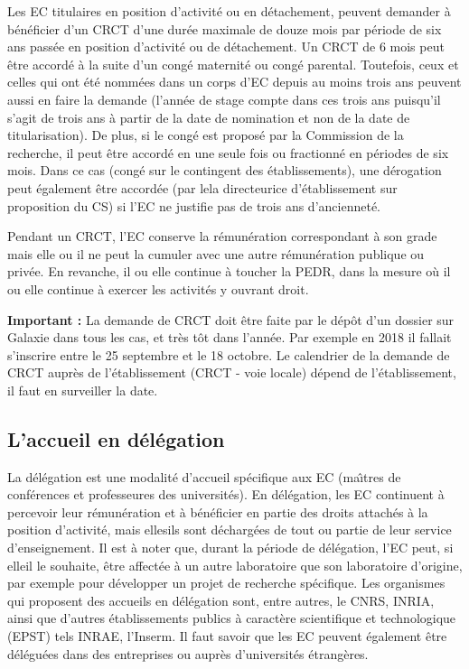 Les EC titulaires en position d'activit\'e ou en d\'etachement,
peuvent demander \`a b\'en\'eficier d'un CRCT d'une dur\'ee maximale
de douze mois par p\'eriode de six ans pass\'ee en position
d'activit\'e ou de d\'etachement. Un CRCT de 6 mois peut \^etre accord\'e
\`a la suite d'un cong\'e maternit\'e ou cong\'e parental.
Toutefois, ceux et celles qui ont \'et\'e
nomm\'e\mp e\mp s dans un corps d'EC depuis au moins trois ans peuvent aussi
en faire la demande (l'ann\'ee de stage compte dans ces trois ans
puisqu'il s'agit de trois ans \`a partir de la date de nomination et
non de la date de titularisation). De plus, si le cong\'e est
propos\'e par la Commission de la recherche, il peut \^etre accord\'e en
une seule fois ou fractionn\'e en p\'eriodes de six mois.
 Dans ce cas (cong\'e sur le contingent des
\'etablissements), une d\'erogation peut \'egalement \^etre accord\'ee
(par le\mp la directeur\mp ice d'\'etablissement sur proposition
du CS) si l'EC ne justifie pas de trois ans d'anciennet\'e.

Pendant un CRCT, l'EC conserve la r\'emun\'eration correspondant \`a son grade
mais elle ou il ne peut la cumuler avec une autre r\'emun\'eration publique ou priv\'ee.
En revanche, il ou elle continue \`a toucher la PEDR, dans la mesure o\`u il ou elle continue \`a exercer les activit\'es y ouvrant droit. 


\textbf{Important :} La demande de CRCT doit \^etre faite par le d\'ep\^ot d’un dossier sur Galaxie dans tous les cas, et tr\`es t\^ot dans l'ann\'ee. Par exemple en 2018 il fallait s'inscrire entre le 25 septembre et le 18 octobre. Le calendrier de la demande de CRCT aupr\`es de l’\'etablissement (CRCT - voie locale) d\'epend de l'\'etablissement, il faut en surveiller la date.

\subsection{L'accueil en d\'el\'egation}
\label{delegation}


La d\'el\'egation est une modalit\'e d'accueil sp\'ecifique aux
EC  (ma\^\i tres de conf\'erences et
professeur\mp e\mp s des universit\'es). En d\'el\'egation, les
EC continuent \`a percevoir leur r\'emun\'eration
et \`a b\'en\'eficier en partie des droits attach\'es \`a la position
d'activit\'e, mais elles\mp ils
sont d\'echarg\'e\mp e\mp s de tout ou partie de leur service d'enseignement.
Il est \`a noter que, durant la p\'eriode de d\'el\'egation, l'EC peut,
si elle\mp il le souhaite, \^etre affect\'e\mp e \`a un autre laboratoire
que son laboratoire d'origine, par exemple pour d\'evelopper
un projet de recherche sp\'ecifique.
Les organismes qui
proposent des accueils en d\'el\'egation sont, entre autres, le
CNRS, INRIA, ainsi que d'autres \'etablis\-se\-ments publics \`a
caract\`ere scientifique et technologique (EPST) tels INRAE,
l'Inserm. Il faut savoir que les EC peuvent
\'egalement \^etre d\'el\'egu\'e\mp e\mp s dans des entreprises ou aupr\`es
d'universit\'es \'etrang\`eres.

